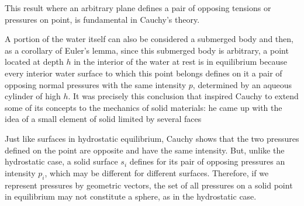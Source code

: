 This result where 
an arbitrary plane defines a pair of opposing tensions or pressures on point, is fundamental in Cauchy's theory. 

 


A portion of the water itself can also be considered a submerged body and then, as a corollary of Euler's lemma, since this submerged body is arbitrary, a point located at depth $h$ in the interior of the water at rest is in equilibrium because every interior water surface to which this point belongs defines on it a pair of opposing normal pressures with the same intensity $p$, determined by an aqueous cylinder of high $h$. It was precisely this conclusion that inspired Cauchy to extend some of its concepts to the mechanics of solid materials: he came up with the idea of a small element of solid limited by several faces  

    

Just like surfaces in hydrostatic equilibrium, Cauchy shows that the two pressures defined on the point are opposite and have the same intensity. But, unlike the hydrostatic case, a solid surface $s_i$ defines for its pair of opposing pressures an intensity $p_i$, which may be different for different surfaces. Therefore, if we represent pressures by geometric vectors, the set of all pressures on a solid point in equilibrium may not constitute a sphere, as in the hydrostatic case.     



                   



